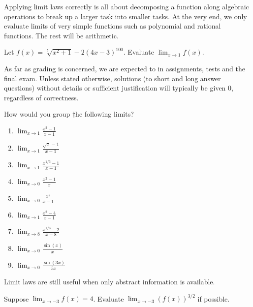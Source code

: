 \documentclass[../main.tex]{subfiles}
\begin{document}
\clearpage

Applying limit laws correctly is all about decomposing a function along algebraic operations to break up a larger task into smaller tasks. At the very end, we only evaluate limits of very simple functions such as polynomial and rational functions. The rest will be arithmetic.
\begin{example}
  Let \(f(x) = \sqrt[5]{x^{2} + 1} - 2 (4x - 3)^{100}\). Evaluate \(\lim_{x \to 1} f(x)\).

\end{example}

\faExclamationTriangle{} As far as grading is concerned, we are expected to  in assignments, tests and the final exam.  Unless stated otherwise, solutions (to short and long answer questions) without details or sufficient justification will typically be given \(0\), regardless of correctness. 
\clearpage

\begin{exercise}
  How would you group †he following limits?

  \begin{multicols}{3}
    \begin{enumerate}[label={\(L_{\arabic*} = \)}]
      \item \(\lim_{x \to 1} \frac{x^{2}-1}{x-1}\)
      \item \(\lim_{x \to 1} \frac{\sqrt{x}-1}{x-1}\)
      \item \(\lim_{x \to 1} \frac{x^{1/3}-1}{x-1}\)
      \item \(\lim_{x \to 0} \frac{x^{2}-1}{x}\)
      \item \(\lim_{x \to 0} \frac{x^{2}}{x-1}\)
      \item \(\lim_{x \to 1} \frac{x^{2}-4}{x-1}\)
      \item \(\lim_{x \to 8} \frac{x^{1/3}-2}{x-8}\)
      \item \(\lim_{x \to 0} \frac{\sin(x)}{x}\)
      \item \(\lim_{x \to 0} \frac{\sin(3x)}{5x}\)
    \end{enumerate}
  \end{multicols}

\end{exercise}

\clearpage

Limit laws are still useful when only abstract information is available.
\begin{example}
  Suppose \(\lim_{x \to -3} f(x) = 4\). Evaluate \(\lim_{x \to -3} \left( f(x) \right)^{3/2}\) if possible.

\end{example}
\end{document}
